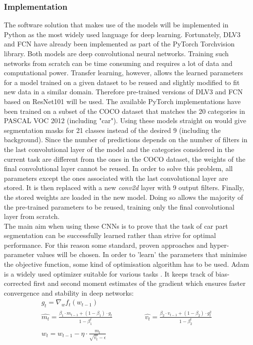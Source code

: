 \documentclass[main.tex]{subfiles}
\begin{document}
\subsubsection{Implementation}
The software solution that makes use of the models will be implemented in Python as the most widely used language for deep learning. Fortunately, DLV3 and FCN have already been implemented as part of the PyTorch Torchvision library. Both models are deep convolutional neural networks. Training such networks from scratch can be time consuming and requires a lot of data and computational power. Transfer learning, however, allows the learned parameters for a model trained on a given dataset to be reused and slightly modified to fit new data in a similar domain. Therefore pre-trained versions of DLV3 and FCN based on ResNet101 will be used. The available PyTorch implementations have been trained on a subset of the COCO dataset \cite{Lin2014} that matches the 20 categories in PASCAL VOC 2012 (including "car"). Using these models straight on would give segmentation masks for 21 classes instead of the desired 9 (including the background). Since the number of predictions depends on the number of filters in the last convolutional layer of the model and the categories considered in the current task are different from the ones in the COCO dataset, the weights of the final convolutional layer cannot be reused. In order to solve this problem, all parameters except the ones associated with the last convolutional layer are stored. It is then replaced with a new \emph{conv2d} layer with 9 output filters. Finally, the stored weights are loaded in the new model. Doing so allows the majority of the pre-trained parameters to be reused, training only the final convolutional layer from scratch.\\
\indent The main aim when using these CNNs is to prove that the task of car part segmentation can be successfully learned rather than strive for optimal performance. For this reason some standard, proven approaches and hyper-parameter values will be chosen. In order to 'learn' the parameters that minimise the objective function, some kind of optimisation algorithm has to be used. Adam is a widely used optimizer suitable for various tasks \cite{Kingma2015}. It keeps track of bias-corrected first and second moment estimates of the gradient which ensures faster convergence and stability in deep networks:
\begin{gather}
g_t = \nabla_{w} f_{t}(w_{t-1}) \\
\hat{m_t} = \frac{\beta_1 \cdot m_{t-1} + (1 - \beta_1) \cdot g_t}{1 - \beta_1^t} \;\;\;\;\;\;\;\;\;\;\;\;\;\;\;\;\;
\hat{v_t} = \frac{\beta_2 \cdot v_{t-1}  + (1 - \beta_2) \cdot g_{t}^2 }{1 - \beta_2^t}  \\ 
w_t = w_{t-1} - \eta \cdot \frac{\hat{m_t}}{\sqrt{\hat{v_t}} - \epsilon} 
\end{gather}
\end{document}
